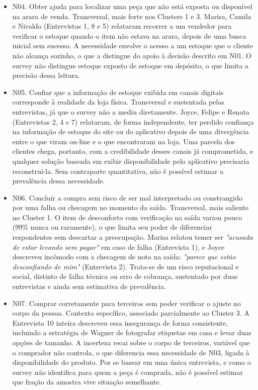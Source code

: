 \begin{itemize}
    \item N04. Obter ajuda para localizar uma peça que não está exposta ou disponível na arara de venda. Transversal, mais forte nos Clusters 1 e 3. Marisa, Camila e Nivaldo (Entrevistas 1, 8 e 5) relataram recorrer a um vendedor para verificar o estoque quando o item não estava na arara, depois de uma busca inicial sem sucesso. A necessidade envolve o acesso a um estoque que o cliente não alcança sozinho, o que a distingue do apoio à decisão descrito em N01. O survey não distingue estoque exposto de estoque em depósito, o que limita a precisão dessa leitura.

    \item N05. Confiar que a informação de estoque exibida em canais digitais corresponde à realidade da loja física. Transversal e sustentada pelas entrevistas, já que o survey não a mediu diretamente. Joyce, Felipe e Renata (Entrevistas 2, 4 e 7) relataram, de forma independente, ter perdido confiança na informação de estoque do site ou do aplicativo depois de uma divergência entre o que viram on-line e o que encontraram na loja. Uma parcela dos clientes chega, portanto, com a credibilidade desses canais já comprometida, e qualquer solução baseada em exibir disponibilidade pelo aplicativo precisaria reconstruí-la. Sem contraparte quantitativa, não é possível estimar a prevalência dessa necessidade.

    \item N06. Concluir a compra sem risco de ser mal interpretado ou constrangido por uma falha ou checagem no momento da saída. Transversal, mais saliente no Cluster 1. O item de desconforto com verificação na saída variou pouco (99\% nunca ou raramente), o que limita seu poder de diferenciar respondentes sem descartar a preocupação. Marisa relatou temer ser \emph{"acusada de estar levando sem pagar"} em caso de falha (Entrevista 1), e Joyce descreveu incômodo com a checagem de nota na saída: \emph{"parece que estão desconfiando de mim"} (Entrevista 2). Trata-se de um risco reputacional e social, distinto de falha técnica ou erro de cobrança, sustentado por duas entrevistas e ainda sem estimativa de prevalência.

    \item N07. Comprar corretamente para terceiros sem poder verificar o ajuste no corpo da pessoa. Contexto específico, associado parcialmente ao Cluster 3. A Entrevista 10 inteira descreveu essa insegurança de forma consistente, incluindo a estratégia de Wagner de fotografar etiquetas em casa e levar duas opções de tamanho. A incerteza recai sobre o corpo de terceiros, variável que o comprador não controla, o que diferencia essa necessidade de N03, ligada à disponibilidade do produto. Por se basear em uma única entrevista, e como o survey não identifica para quem a peça é comprada, não é possível estimar que fração da amostra vive situação semelhante.


\end{itemize}
